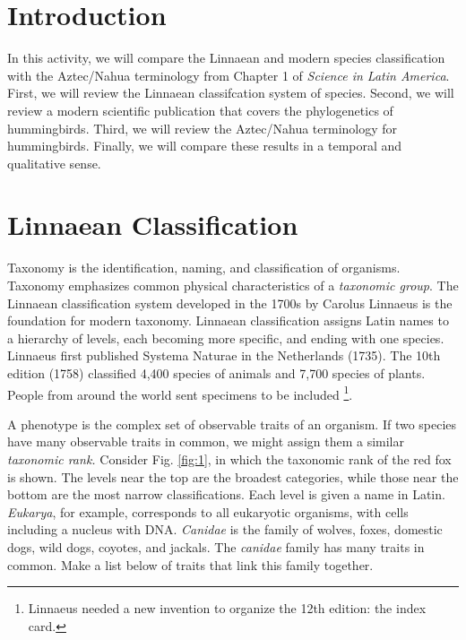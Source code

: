 \documentclass[12pt]{article}
\begin{document}
\maketitle

\section{Introduction}

In this activity, we will compare the Linnaean and modern species classification with the Aztec/Nahua terminology from Chapter 1 of \textit{Science in Latin America}.  First, we will review the Linnaean classifcation system of species.  Second, we will review a modern scientific publication \cite{10.1016/j.cub.2014.03.016} that covers the phylogenetics of hummingbirds.  Third, we will review the Aztec/Nahua terminology for hummingbirds.  Finally, we will compare these results in a temporal and qualitative sense.

\section{Linnaean Classification}

Taxonomy is the identification, naming, and classification of organisms.  Taxonomy emphasizes common physical characteristics of a \textit{taxonomic group}.  The Linnaean classification system developed in the 1700s by Carolus Linnaeus is the foundation for modern taxonomy. Linnaean classification assigns Latin names to a hierarchy of levels, each becoming more specific, and ending with one species.  Linnaeus first published Systema Naturae in the Netherlands (1735).  The 10th edition (1758) classified 4,400 species of animals and 7,700 species of plants. People from around the world sent specimens to be included \footnote{Linnaeus needed a new invention to organize the 12th edition: the index card.}.

A phenotype is the complex set of observable traits of an organism.  If two species have many observable traits in common, we might assign them a similar \textit{taxonomic rank.}  Consider Fig. \ref{fig:1}, in which the taxonomic rank of the red fox is shown.  The levels near the top are the broadest categories, while those near the bottom are the most narrow classifications.  Each level is given a name in Latin.  \textit{Eukarya}, for example, corresponds to all eukaryotic organisms, with cells including a nucleus with DNA.  \textit{Canidae} is the family of wolves, foxes, domestic dogs, wild dogs, coyotes, and jackals.  The \textit{canidae} family has many traits in common.  Make a list below of traits that link this family together.
\end{document}
